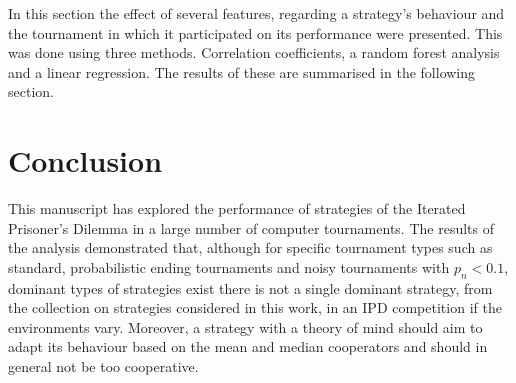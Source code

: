 \documentclass{article}
\newcommand{\numberofstrategies}{}
\begin{document}
\begin{figure}[!htbp]
\begin{subfigure}{0.35\textwidth}
    \end{subfigure}
\end{figure}

In this section the effect of several features, regarding a strategy's behaviour
and the tournament in which it participated on its performance were presented.
This was done using three methods. Correlation coefficients, a random forest
analysis and a linear regression. The results of these are summarised in the following section.

\section{Conclusion}\label{section:conclusion}

This manuscript has explored the performance of \numberofstrategies strategies of the Iterated
Prisoner's Dilemma in a large number of computer tournaments. The results of
the analysis demonstrated that, although for specific tournament types such as
standard, probabilistic ending tournaments and noisy tournaments with \(p_n <0.1\), dominant types of strategies exist
there is not a single dominant strategy, from the collection on strategies considered in this work, in an IPD competition if the environments
vary. Moreover, a strategy with a theory of mind should aim to adapt its behaviour
based on the mean and median cooperators and should in general not be too
cooperative.
\end{document}

